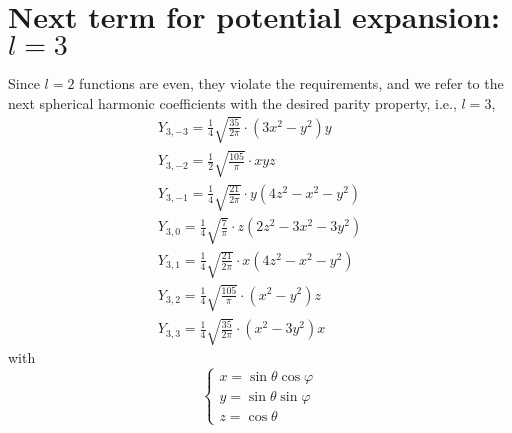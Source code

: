 \documentclass[11pt]{amsart}
\begin{document}
\section{Next term for potential expansion: $l=3$}
Since $l=2$ functions are even, they violate the requirements, and 
we  refer to the next spherical harmonic coefficients with the desired parity property, i.e., $l=3$,
$$
\begin{array}{l}
Y_{3,-3}=\frac{1}{4} \sqrt{\frac{35}{2 \pi}} \cdot {\left(3 x^{2}-y^{2}\right) y} \\
Y_{3,-2}=\frac{1}{2} \sqrt{\frac{105}{\pi}} \cdot {x y z} \\
Y_{3,-1}=\frac{1}{4} \sqrt{\frac{21}{2 \pi}} \cdot {y\left(4 z^{2}-x^{2}-y^{2}\right)} \\
Y_{3,0}=\frac{1}{4} \sqrt{\frac{7}{\pi}} \cdot {z\left(2 z^{2}-3 x^{2}-3 y^{2}\right)} \\
Y_{3,1}=\frac{1}{4} \sqrt{\frac{21}{2 \pi}} \cdot {x\left(4 z^{2}-x^{2}-y^{2}\right)} \\
Y_{3,2}=\frac{1}{4} \sqrt{\frac{105}{\pi}} \cdot {\left(x^{2}-y^{2}\right) z} \\
Y_{3,3}=\frac{1}{4} \sqrt{\frac{35}{2 \pi}} \cdot {\left(x^{2}-3 y^{2}\right) x}
\end{array}
$$
with 
$$
\left\{\begin{array}{l}
x= \sin \theta \cos \varphi \\
y= \sin \theta \sin \varphi \\
z=\cos \theta
\end{array}\right.
$$

        
\end{document}
